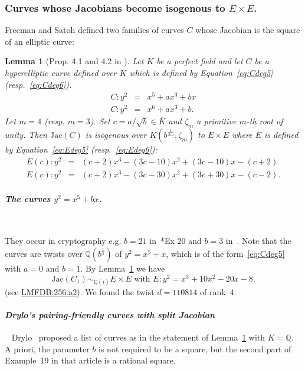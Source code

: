 \documentclass{amsart}
\newcommand{\Q}{{\mathbb Q}}
\newcommand{\Jac}{\mathrm{Jac}}
\newtheorem{lemma}[proposition]{Lemma}
\begin{document}
\subsubsection{Curves whose Jacobians become isogenous to \(E\times E\).}

Freeman and Satoh defined two families of curves $C$ whose Jacobian is the square of an elliptic curve:
\begin{lemma}[Prop. 4.1 and 4.2 in \cite{Freeman2011}]\label{lem:FreemanSatoh}
Let $K$ be a perfect field and let $C$ be a hyperelliptic curve defined over $K$ which is defined by Equation~\eqref{eq:Cdeg5} (resp.~\eqref{eq:Cdeg6}).
\begin{eqnarray}
C:y^2&=&x^5+ax^3+bx \label{eq:Cdeg5}\\
C:y^2&=&x^6+ax^3+b.\label{eq:Cdeg6}
\end{eqnarray}
Let $m=4$ (resp. $m=3$).
 Set $c=a/\sqrt{b}\in \overline{K}$ and $\zeta_m$ a primitive $m$-th root of unity. Then $\Jac(C)$ is isogenous over $K(b^{\frac{1}{2m}},\zeta_m)$ to $E\times E$ where $E$ is defined by Equation~\eqref{eq:Edeg5} (resp.~\eqref{eq:Edeg6}):
\begin{eqnarray}
E(c):y^2&=&(c+2)x^3-(3c-10)x^2+(3c-10)x-(c+2)\label{eq:Edeg5}\\
E(c):y^2&=&(c+2)x^3-(3c-30)x^2+(3c+30)x-(c-2)   .\label{eq:Edeg6}
\end{eqnarray}
\end{lemma}



\medskip

\paragraph{\emph{The curves $y^2=x^5+bx$.}}~

They occur in cryptography e.g.  $b=21$ in~\cite{Drylo2012}*{Ex 20} and $b=3$ in~\cite{Kawazoe2008}. Note that the curves are twists over $\Q(b^{\frac{1}{5}})$ of $y^2=x^5+x$, which is of the form~\eqref{eq:Cdeg5} with $a=0$ and $b=1$. By Lemma~\ref{lem:FreemanSatoh} we have
$$\Jac(C_1)\sim_{\mathbb Q(i)} E\times E 
\text{ with }
E:y^2= x^3+10x^2-20x-8.
$$
(see \href{https://www.lmfdb.org/EllipticCurve/Q/256/a/2}{LMFDB:256.a2}). We found the twist $d=110814$ of rank~$4$.\medskip

\paragraph{\emph{Drylo's pairing-friendly curves with
split Jacobian}}~ 
Drylo~\cite{Drylo2012} proposed a list of curves as in the statement of Lemma~\ref{lem:FreemanSatoh} with $K=\Q$. A priori, the parameter $b$ is not required to be a square, but the second part of Example~19 in that article is a rational square. 
\end{document}
